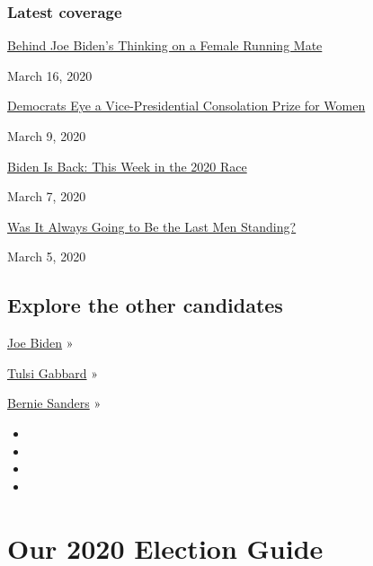 \hypertarget{latest-coverage}{%
\subsubsection{Latest coverage}\label{latest-coverage}}

\href{https://www.nytimes.com/2020/03/16/us/politics/joe-biden-vp-running-mate.html}{Behind
Joe Biden's Thinking on a Female Running Mate}

March 16, 2020

\href{https://www.nytimes.com/2020/03/09/us/politics/democrats-women-vice-president.html}{Democrats
Eye a Vice-Presidential Consolation Prize for Women}

March 9, 2020

\href{https://www.nytimes.com/2020/03/07/us/politics/joe-biden-super-tuesday-warren-bloomberg.html}{Biden
Is Back: This Week in the 2020 Race}

March 7, 2020

\href{https://www.nytimes.com/2020/03/05/us/politics/women-voters-democratic-candidates.html}{Was
It Always Going to Be the Last Men Standing?}

March 5, 2020

\hypertarget{explore-the-other-candidates}{%
\subsection{Explore the other
candidates}\label{explore-the-other-candidates}}

\href{https://www.nytimes.com/interactive/2020/us/elections/joe-biden.html}{Joe
Biden} »

\href{https://www.nytimes.com/interactive/2020/us/elections/tulsi-gabbard.html}{Tulsi
Gabbard} »

\href{https://www.nytimes.com/interactive/2020/us/elections/bernie-sanders.html}{Bernie
Sanders} »

\begin{itemize}
\item
\item
\item
\item
\end{itemize}

\hypertarget{our-2020-election-guide}{%
\section{Our 2020 Election Guide}\label{our-2020-election-guide}}

